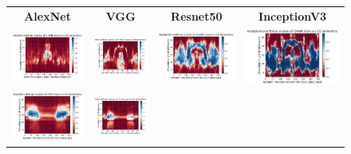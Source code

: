 \begin{figure}[t]
\centering
\tabcolsep=0.08cm
  \begin{tabular}{c|c|c|c}
  \textbf{AlexNet}\cite{AlexNet} & \textbf{VGG}\cite{vgg} & \textbf{Resnet50}\cite{resnet} & \textbf{InceptionV3}\cite{inception} \\
  \includegraphics[trim={3cm 1.4cm 2.8cm 1.2cm},clip, width=.24\linewidth]{images/pipeline/AlexNet_chair_7.pdf}&
  \includegraphics[trim={3cm 1.8cm 2.8cm 1.2cm},clip, width=.23\linewidth]{images/pipeline/VGG_chair_7.pdf}&
  \includegraphics[trim={3.2cm 1.4cm 2.8cm 1.4cm},clip, width=.257\linewidth]{images/pipeline/ResNet50_chair_7.pdf}&
  \includegraphics[trim={3.5cm 1.4cm 3cm 1.4cm},clip, width=.259\linewidth]{images/pipeline/Inceptionv3_chair_7.pdf} \\ \hline
  \includegraphics[trim={3cm 1.4cm 2.8cm 1.2cm},clip, width=.24\linewidth]{images/pipeline/AlexNet_cup_4.pdf}&
  \includegraphics[trim={3cm 1.85cm 2.8cm 1.2cm},clip, width=.23\linewidth]{images/pipeline/VGG_cup_4.pdf}&

\end{tabular}
\end{figure}
